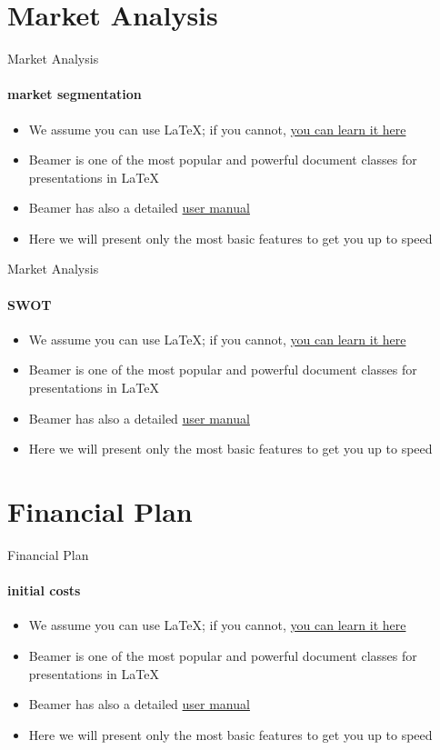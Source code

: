 \documentclass{beamer}
\newcommand{\hrefcol}[2]{\textcolor{cyan}{\href{#1}{#2}}}
\begin{document}
\section{Market Analysis}

\begin{frame}{Market Analysis}
\framesubtitle{market segmentation}
\begin{itemize}
\item We assume you can use \LaTeX; if you cannot,
\hrefcol{http://en.wikibooks.org/wiki/LaTeX/}{you can learn it here}
\item Beamer is one of the most popular and powerful document
classes for presentations in \LaTeX
\item Beamer has also a detailed
\hrefcol{http://www.ctan.org/tex-archive/macros/latex/contrib/beamer/doc/beameruserguide.pdf}{user
 manual}
\item Here we will present only the most basic features to get you up to speed
\end{itemize}
\end{frame}

\begin{frame}{Market Analysis}
\framesubtitle{SWOT}
\begin{itemize}
\item We assume you can use \LaTeX; if you cannot,
\hrefcol{http://en.wikibooks.org/wiki/LaTeX/}{you can learn it here}
\item Beamer is one of the most popular and powerful document
classes for presentations in \LaTeX
\item Beamer has also a detailed
\hrefcol{http://www.ctan.org/tex-archive/macros/latex/contrib/beamer/doc/beameruserguide.pdf}{user
 manual}
\item Here we will present only the most basic features to get you up to speed
\end{itemize}
\end{frame}

\section{Financial Plan}

\begin{frame}{Financial Plan}
\framesubtitle{initial costs}
\begin{itemize}
\item We assume you can use \LaTeX; if you cannot,
\hrefcol{http://en.wikibooks.org/wiki/LaTeX/}{you can learn it here}
\item Beamer is one of the most popular and powerful document
classes for presentations in \LaTeX
\item Beamer has also a detailed
\hrefcol{http://www.ctan.org/tex-archive/macros/latex/contrib/beamer/doc/beameruserguide.pdf}{user
 manual}
\item Here we will present only the most basic features to get you up to speed
\end{itemize}
\end{frame}
\end{document}
